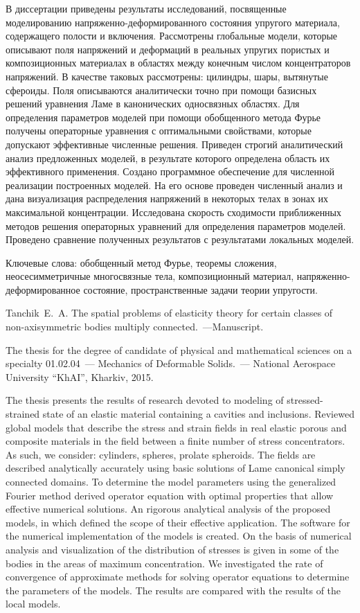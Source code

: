 \documentclass[book,14pt,small,oneside]{ncc}
\begin{document}
В диссертации приведены результаты исследований, посвященные моделированию на\-пря\-же\-н\-но-де\-фор\-ми\-ро\-ва\-н\-но\-го состояния упругого материала, содержащего полости и включения. Рассмотрены глобальные модели, которые описывают поля напряжений и деформаций в реальных упругих пористых и композиционных материалах в областях между конечным числом  концентраторов напряжений. В качестве таковых рассмотрены: цилиндры, шары, вытянутые сфероиды. Поля описываются аналитически точно при помощи базисных решений уравнения Ламе в канонических односвязных областях. Для определения параметров моделей при помощи обобщенного метода Фурье получены операторные уравнения с оптимальными свойствами, которые допускают эффективные численные решения. Приведен строгий аналитический анализ предложенных моделей, в результате которого определена область их эффективного применения. Создано программное обеспечение для численной реализации построенных моделей. На его основе проведен численный анализ и дана визуализация распределения напряжений в некоторых телах в зонах их максимальной концентрации. Исследована скорость сходимости приближенных методов решения операторных уравнений для определения параметров моделей. Проведено сравнение полученных результатов с результатами локальных моделей.

Ключевые слова: обобщенный метод Фурье, теоремы сложения, неосесимметричные многосвязные тела, композиционный материал, на\-пряже\-н\-но-де\-фор\-ми\-ро\-ван\-ное состояние, пространственные задачи теории упругости.

Tanchik~E.~A. The spatial problems of elasticity theory for certain classes of non-axisymmetric bodies multiply connected.~---Manuscript.

The thesis for the degree of candidate of physical and mathematical sciences on a specialty 01.02.04~--- Mechanics of Deformable Solids.~--- National Aerospace University ``KhAI'', Kharkiv, 2015.

The thesis presents the results of research devoted to modeling of stressed-strained state of an elastic material containing a cavities and inclusions. Reviewed global models that describe the stress and strain fields in real elastic porous and composite materials in the field between a finite number of stress concentrators. As such, we consider: cylinders, spheres, prolate spheroids. The fields are described analytically accurately using basic solutions of Lame canonical simply connected domains. To determine the model parameters using the generalized Fourier method derived operator equation with optimal properties that allow effective numerical solutions. An rigorous analytical analysis of the proposed models, in which defined the scope of their effective application. The software for the numerical im\-ple\-men\-ta\-ti\-on of the models is created. On the basis of numerical analysis and visualization of the distribution of stresses is given in some of the bodies in the areas of maximum concentration. We investigated the rate of convergence of approximate methods for solving operator equations to determine the parameters of the models. The results are compared with the results of the local models.
\end{document}
